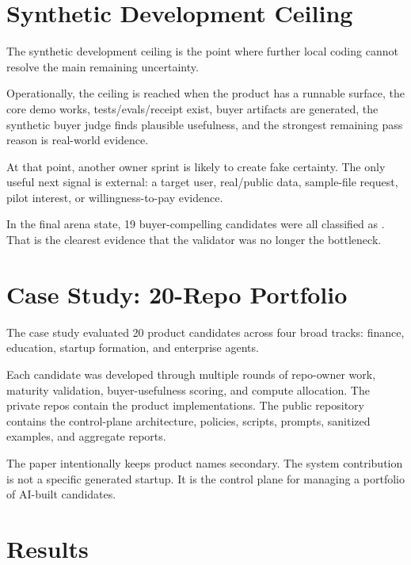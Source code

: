 \documentclass[11pt]{article}
\newcommand{\code}[1]{\texttt{\seqsplit{#1}}}
\begin{document}
\section{Synthetic Development Ceiling}

The synthetic development ceiling is the point where further local coding cannot resolve the main remaining uncertainty.

Operationally, the ceiling is reached when the product has a runnable surface, the core demo works, tests/evals/receipt exist, buyer artifacts are generated, the synthetic buyer judge finds plausible usefulness, and the strongest remaining pass reason is real-world evidence.

At that point, another owner sprint is likely to create fake certainty. The only useful next signal is external: a target user, real/public data, sample-file request, pilot interest, or willingness-to-pay evidence.

In the final arena state, 19 buyer-compelling candidates were all classified as \code{external-proof-required}. That is the clearest evidence that the validator was no longer the bottleneck.

\section{Case Study: 20-Repo Portfolio}

The case study evaluated 20 product candidates across four broad tracks: finance, education, startup formation, and enterprise agents.

Each candidate was developed through multiple rounds of repo-owner work, maturity validation, buyer-usefulness scoring, and compute allocation. The private repos contain the product implementations. The public repository contains the control-plane architecture, policies, scripts, prompts, sanitized examples, and aggregate reports.

The paper intentionally keeps product names secondary. The system contribution is not a specific generated startup. It is the control plane for managing a portfolio of AI-built candidates.

\section{Results}
\end{document}
